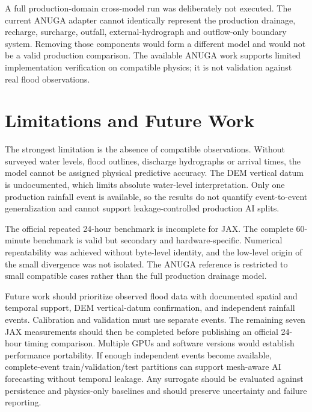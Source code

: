 \documentclass[11pt,a4paper,oneside]{report}
\begin{document}
A full production-domain cross-model run was deliberately not executed. The current ANUGA
adapter cannot identically represent the production drainage, recharge, surcharge, outfall,
external-hydrograph and outflow-only boundary system. Removing those components would form
a different model and would not be a valid production comparison. The available ANUGA work
supports limited implementation verification on compatible physics; it is not validation
against real flood observations.

\chapter{Limitations and Future Work}\label{chap:limits}
The strongest limitation is the absence of compatible observations. Without surveyed water
levels, flood outlines, discharge hydrographs or arrival times, the model cannot be assigned
physical predictive accuracy. The DEM vertical datum is undocumented, which limits absolute
water-level interpretation. Only one production rainfall event is available, so the results
do not quantify event-to-event generalization and cannot support leakage-controlled
production AI splits.

The official repeated 24-hour benchmark is incomplete for JAX. The complete 60-minute
benchmark is valid but secondary and hardware-specific. Numerical repeatability was achieved
without byte-level identity, and the low-level origin of the small divergence was not
isolated. The ANUGA reference is restricted to small compatible cases rather than the full
production drainage model.

Future work should prioritize observed flood data with documented spatial and temporal
support, DEM vertical-datum confirmation, and independent rainfall events. Calibration and
validation must use separate events. The remaining seven JAX measurements should then be
completed before publishing an official 24-hour timing comparison. Multiple GPUs and
software versions would establish performance portability. If enough independent events
become available, complete-event train/validation/test partitions can support mesh-aware AI
forecasting without temporal leakage. Any surrogate should be evaluated against persistence
and physics-only baselines and should preserve uncertainty and failure reporting.

\end{document}
